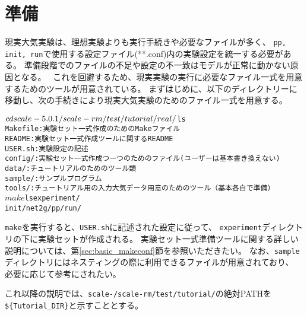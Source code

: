 \section{準備} \label{sec:tutrial_real_prep}

現実大気実験は、理想実験よりも実行手続きや必要なファイルが多く、
\verb|pp, init, run|で使用する設定ファイル(**.conf)内の実験設定を統一する必要がある。
準備段階でのファイルの不足や設定の不一致はモデルが正常に動かない原因となる。　
これを回避するため、現実実験の実行に必要なファイル一式を用意するためのツールが用意されている。
まずはじめに、以下のディレクトリーに移動し、次の手続きにより現実大気実験のためのファイル一式を用意する。
\begin{alltt}
 $ cd scale-{\version}/scale-rm/test/tutorial/real/
 $ ls 
    Makefile : 実験セット一式作成のためのMakeファイル
    README   : 実験セット一式作成ツールに関するREADME
    USER.sh  : 実験設定の記述
    config/  : 実験セット一式作成つーつのためのファイル(ユーザーは基本書き換えない)
    data/    : チュートリアルのためのツール類
    sample/  : サンプルプログラム
    tools/   : チュートリアル用の入力大気データ用意のためのツール（基本各自で準備）
 $ make
 $ ls experiment/
   init/  net2g/  pp/  run/
\end{alltt}
\verb|make|を実行すると、\verb|USER.sh|に記述された設定に従って、
\verb|experiment|ディレクトリの下に実験セットが作成される。
実験セット一式準備ツールに関する詳しい説明については、第\ref{sec:basic_makeconf}節を参照いただきたい。
なお、\verb|sample|ディレクトリにはネスティングの際に利用できるファイルが用意されており、
必要に応じて参考にされたい。

これ以降の説明では、\texttt{scale-{\version}/scale-rm/test/tutorial/}の絶対PATHを
\verb|${Tutorial_DIR}|と示すこととする。

